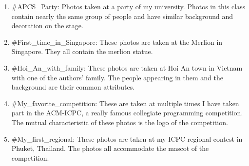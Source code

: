 \begin{enumerate}

\item \#APCS\_Party: Photos taken at a party of my university. Photos in this class contain nearly the same group of people and have similar background and decoration on the stage.
\item \#First\_time\_in\_Singapore: These photos are taken at the Merlion in Singapore. They all contain the merlion statue.
\item \#Hoi\_An\_with\_family: These photos are taken at Hoi An town in Vietnam with one of the authors' family. The people appearing in them and the background are their common attributes.
\item \#My\_favorite\_competition: These are taken at multiple times I have taken part in the ACM-ICPC, a really famous collegiate programming competition. The mutual characteristic of these photos is the logo of the competition.
\item \#My\_first\_regional: These photos are taken at my ICPC regional contest in Phuket, Thailand. The photos all accommodate the mascot of the competition.

\end{enumerate}

